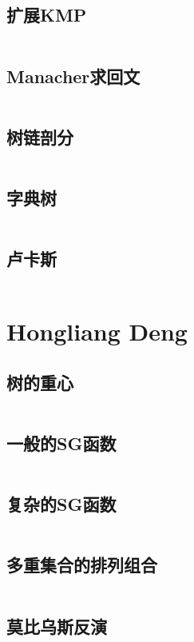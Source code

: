 \documentclass[a4paper,11pt]{article}
\begin{document}
\subsection{扩展KMP}
\inputminted[breaklines]{c++}{Li/扩展KMP.cpp}
\subsection{Manacher求回文}
\inputminted[breaklines]{c++}{Li/Manacher求回文.cpp}
\subsection{树链剖分}
\inputminted[breaklines]{c++}{Li/树链剖分.cpp}
\subsection{字典树}
\inputminted[breaklines]{c++}{Li/字典树.cpp}
\subsection{卢卡斯}
\inputminted[breaklines]{c++}{Li/卢卡斯.cpp}

\newpage
\mbox{}
\newpage
\mbox{}
\newpage

\section{Hongliang Deng}
\subsection{树的重心}
\inputminted[breaklines]{c++}{Deng/树的重心.cpp}
\subsection{一般的SG函数}
\inputminted[breaklines]{c++}{Deng/一般的SG函数.cpp}
\subsection{复杂的SG函数}
\inputminted[breaklines]{c++}{Deng/复杂的SG函数.cpp}
\subsection{多重集合的排列组合}
\inputminted[breaklines]{c++}{Deng/多重集合的排列组合.cpp}
\subsection{莫比乌斯反演}
\inputminted[breaklines]{c++}{Deng/莫比乌斯反演.cpp}
\end{document}
